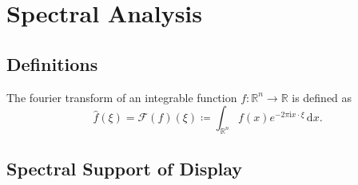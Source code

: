 \chapter{Spectral Analysis}


\section{Definitions}

The fourier transform of an integrable function $f \colon \mathbb{R}^n \to \mathbb{R}$ is defined as 
\begin{equation}
	\hat{f}(\xi) = \mathcal{F}(f)(\xi) \coloneqq \int_{\mathbb{R}^n} f(x) e^{-2 \pi \mathrm{i} x \cdot \xi} \, \mathrm{d}x.
\end{equation}

\section{Spectral Support of Display}